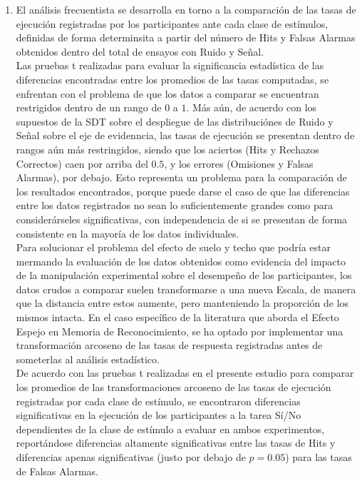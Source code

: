 \documentclass[jou,apacite]{apa6}
\begin{document}
\begin{enumerate}
\item El análisis frecuentista se desarrolla en torno a la comparación de las tasas de ejecución registradas por los participantes ante cada clase de estímulos, definidas de forma determinsita a partir del número de Hits y Falsas Alarmas obtenidos dentro del total de ensayos con Ruido y Señal.\\

Las pruebas t realizadas para evaluar la significancia estadística de las diferencias encontradas entre los promedios de las tasas computadas, se enfrentan con el problema de que los datos a comparar se encuentran restrigidos dentro de un rango de $0$ a $1$. Más aún, de acuerdo con los supuestos de la SDT sobre el despliegue de las distribuciónes de Ruido y Señal sobre el eje de evidenncia, las tasas de ejecución se presentan dentro de rangos aún más restringidos, siendo que los aciertos (Hits y Rechazos Correctos) caen por arriba del $0.5$, y los errores (Omisiones y Falsas Alarmas), por debajo. Esto representa un problema para la comparación de los resultados encontrados, porque puede darse el caso de que las diferencias entre los datos registrados no sean lo suficientemente grandes como para considerárseles significativas, con independencia de si se presentan de forma consistente en la mayoría de los datos individuales.\\

Para solucionar el problema del efecto de suelo y techo que podría estar mermando la evaluación de los datos obtenidos como evidencia del impacto de la manipulación experimental sobre el desempeño de los participantes, los datos crudos a comparar suelen transformarse a una nueva Escala, de manera que la distancia entre estos aumente, pero manteniendo la proporción de los mismos intacta. En el caso específico de la literatura que aborda el Efecto Espejo en Memoria de Reconocimiento, se ha optado por implementar una transformación arcoseno de las tasas de respuesta registradas antes de someterlas al análisis estadístico.\\

De acuerdo con las pruebas t realizadas en el presente estudio para comparar los promedios de las transformaciones arcoseno de las tasas de ejecución registradas por cada clase de estímulo, se encontraron diferencias significativas en la ejecución de los participantes a la tarea Sí/No dependientes de la clase de estímulo a evaluar en ambos experimentos, reportándose diferencias altamente significativas entre las tasas de Hits y diferencias apenas significativas (justo por debajo de $p=0.05$) para las tasas de Falsas Alarmas.\\


\end{enumerate}
\end{document}
